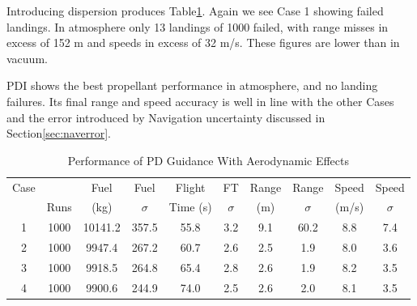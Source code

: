 Introducing dispersion produces Table\:\ref{tab:disppowatmo}. Again we see Case 1 showing failed landings. In atmosphere only 13 landings of 1000 failed, with range misses in excess of 152 m and speeds in excess of 32 m/s. These figures are lower than in vacuum.

PDI shows the best propellant performance in atmosphere, and no landing failures. Its final range and speed accuracy is well in line with the other Cases and the error introduced by Navigation uncertainty discussed in Section\:\ref{sec:naverror}.

\begin{table}[ht]                                                                                                  
	\centering        
	\caption{Performance of PD Guidance With Aerodynamic Effects}                                                  
	\label{tab:disppowatmo}                                                                                                
	\begin{tabular}{|c|c|c|c|c|c|c|c|c|c|}                                                                         
		\hline                                                                                                        Case  &      &   Fuel    &    Fuel   & Flight    &   FT     &  Range    &  Range   & Speed   &   Speed  \\ 
		      & Runs & (kg)      & $\sigma$  &  Time (s) & $\sigma$ &  (m) &    $  \sigma$ & (m/s)   & $\sigma$ \\
		\hline                                                                                                        
		1 & 1000 & 10141.2 & 357.5 & 55.8 & 3.2 & 9.1 & 60.2 & 8.8 & 7.4 \\                                            
		\hline                                                                                                        
		2 & 1000 & 9947.4 & 267.2 & 60.7 & 2.6 & 2.5 & 1.9 & 8.0 & 3.6 \\                                              
		\hline                                                                                                        
		3 & 1000 & 9918.5 & 264.8 & 65.4 & 2.8 & 2.6 & 1.9 & 8.2 & 3.5 \\                                              
		\hline                                                                                                        
		4 & 1000 & 9900.6 & 244.9 & 74.0 & 2.5 & 2.6 & 2.0 & 8.1 & 3.5 \\                                              

\end{tabular}
\end{table}
